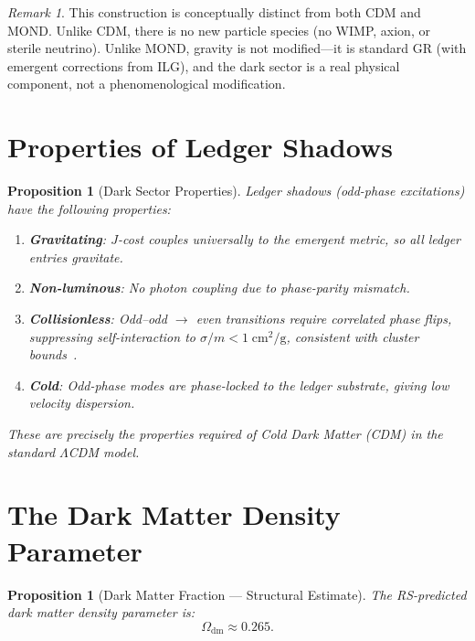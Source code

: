 \documentclass[12pt,a4paper]{article}
\newtheorem{proposition}[theorem]{Proposition}
\theoremstyle{definition}
\theoremstyle{remark}
\newtheorem{remark}[theorem]{Remark}
\begin{document}
\begin{remark}
This construction is conceptually distinct from both CDM
and MOND.  Unlike CDM, there is no new particle species
(no WIMP, axion, or sterile neutrino).  Unlike MOND,
gravity is not modified---it is standard GR (with
emergent corrections from ILG), and the dark sector is a
real physical component, not a phenomenological
modification.
\end{remark}

\section{Properties of Ledger Shadows}
\label{sec:properties}

\begin{proposition}[Dark Sector Properties]
\label{prop:properties}
Ledger shadows (odd-phase excitations) have the following
properties:
\begin{enumerate}
  \item \textbf{Gravitating}: $J$-cost couples universally
  to the emergent metric, so all ledger entries gravitate.
  \item \textbf{Non-luminous}: No photon coupling due to
  phase-parity mismatch.
  \item \textbf{Collisionless}: Odd--odd $\to$ even
  transitions require correlated phase flips,
  suppressing self-interaction to
  $\sigma/m < 1\;\mathrm{cm^2\!/g}$, consistent
  with cluster bounds~\cite{Markevitch2004}.
  \item \textbf{Cold}: Odd-phase modes are phase-locked to
  the ledger substrate, giving low velocity dispersion.
\end{enumerate}
These are precisely the properties required of Cold Dark
Matter (CDM) in the standard $\Lambda$CDM model.
\end{proposition}

\section{The Dark Matter Density Parameter}
\label{sec:omega-dm}

\begin{proposition}[Dark Matter Fraction --- Structural Estimate]
\label{thm:omega-dm}
The RS-predicted dark matter density parameter is:
\begin{equation}
  \Omega_{\mathrm{dm}} \approx 0.265.
  \label{eq:omega-dm}
\end{equation}
\end{proposition}
\end{document}
